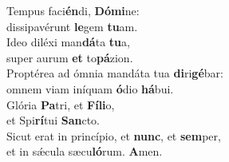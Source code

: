 \evenverse Tempus faci\textbf{én}di, \textbf{Dó}\textbf{mi}ne:~\*\\
\evenverse dissipavérunt \textbf{le}gem \textbf{tu}am.\\
\oddverse Ideo diléxi man\textbf{dá}ta \textbf{tu}a,~\*\\
\oddverse super aurum \textbf{et} to\textbf{pá}zion.\\
\evenverse Proptérea ad ómnia mandáta tua \textbf{di}ri\textbf{gé}bar:~\*\\
\evenverse omnem viam iníquam \textbf{ó}dio \textbf{há}bui.\\
\oddverse Glória \textbf{Pa}tri, et \textbf{Fí}\textbf{li}o,~\*\\
\oddverse et Spi\textbf{rí}tui \textbf{San}cto.\\
\evenverse Sicut erat in princípio, et \textbf{nunc}, et \textbf{sem}per,~\*\\
\evenverse et in sǽcula sæcu\textbf{ló}rum. \textbf{A}men.\\
